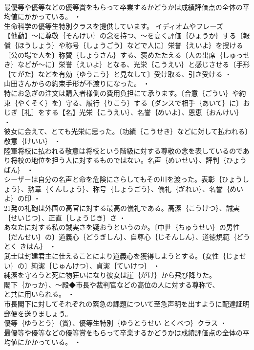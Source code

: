 \documentclass[8pt]{extreport}
\begin{document}
\begin{CJK}{UTF8}{min}
\\	最優等や優等などの優等賞をもらって卒業するかどうかは成績評価点の全体の平均値にかかっている。 ・
\\	生命科学の優等生特別クラスを提供しています。	イディオムやフレーズ 
\\	【他動】～に尊敬｛そんけい｝の念を持つ、～を高く評価｛ひょうか｝する〔報償｛ほうしょう｝や称号｛しょうごう｝などで人に〕栄誉｛えいよ｝を授ける〔公の場で人を〕称賛｛しょうさん｝する、褒めたたえる〔人の出席｛しゅっせき｝などが～に〕栄誉｛えいよ｝となる、光栄｛こうえい｝と感じさせる〔手形｛てがた｝などを有効｛ゆうこう｝と見なして〕受け取る、引き受ける ・
\\	山田さんからの約束手形が不渡りになった。 ・
\\	特にお急ぎの注文は購入者様側の費用負担にて承ります。〔合意｛ごうい｝や約束｛やくそく｝を〕守る、履行｛りこう｝する〔ダンスで相手｛あいて｝に〕おじぎ［礼］をする【名】光栄｛こうえい｝、名誉｛めいよ｝、恩恵｛おんけい｝ ・
\\	彼女に会えて、とても光栄に思った。〔功績｛こうせき｝などに対して払われる〕敬意｛けいい｝ ・
\\	陸軍将校に払われる敬意は将校という階級に対する尊敬の念を表しているのであり将校の地位を担う人に対するものではない。名声｛めいせい｝、評判｛ひょうばん｝ ・
\\	シーザーは自分の名声と命を危険にさらしてもその川を渡った。表彰｛ひょうしょう｝、勲章｛くんしょう｝、称号｛しょうごう｝、儀礼｛ぎれい｝、名誉｛めいよ｝の印 ・
\\	21発の礼砲は外国の高官に対する最高の儀礼である。高潔｛こうけつ｝、誠実｛せいじつ｝、正直｛しょうじき｝さ ・
\\	あなたに対する私の誠実さを疑おうというのか。〔中世｛ちゅうせい｝の男性｛だんせい｝の〕道義心｛どうぎしん｝、自尊心｛じそんしん｝、道徳規範｛どうとく きはん｝ ・
\\	武士は封建君主に仕えることにより道義心を獲得しようとする。〔女性｛じょせい｝の〕純潔｛じゅんけつ｝、貞潔｛ていけつ｝ ・
\\	純潔を守ろうと死に物狂いになり彼女は崖｛がけ｝から飛び降りた。
\\	閣下｛かっか｝、～殿◆市長や裁判官などの高位の人に対する尊称で、
\\	と共に用いられる。 ・
\\	市長閣下に対してそれぞれの緊急の課題について至急声明を出すように配達証明郵便を送りましょう。
\\	優等｛ゆうとう｝（賞）、優等生特別｛ゆうとうせい とくべつ｝クラス ・
\\	最優等や優等などの優等賞をもらって卒業するかどうかは成績評価点の全体の平均値にかかっている。 ・

\end{CJK}
\end{document}
